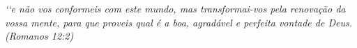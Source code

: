 \begin{epigrafe}
\vspace*{\fill}
\begin{flushright}
\textit{‘‘e não vos conformeis com este mundo, mas transformai-vos pela renovação da vossa mente, para que proveis qual é a boa, agradável e perfeita vontade de Deus.\\
(Romanos 12:2)}
\end{flushright}
\end{epigrafe}
